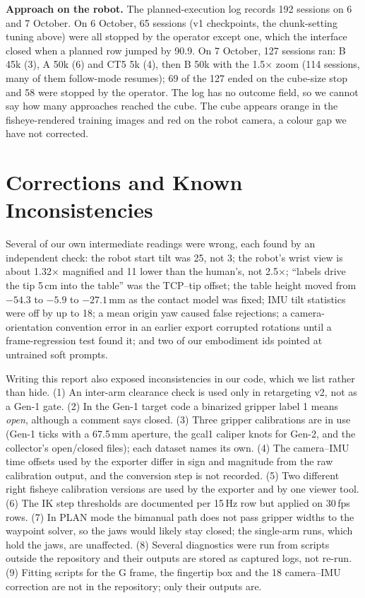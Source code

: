 \documentclass[conference,10pt]{IEEEtran}
\newcommand{\mm}{\,mm\xspace}
\begin{document}
\textbf{Approach on the robot.} The planned-execution log records 192 sessions on 6 and 7 October. On 6 October, 65 sessions (v1
checkpoints, the chunk-setting tuning above) were all stopped by the operator except one, which the interface closed when a planned
row jumped by 90.9\textdegree. On 7 October, 127 sessions ran: B 45k (3), A 50k (6) and CT5 5k (4), then B 50k with the 1.5$\times$
zoom (114 sessions, many of them follow-mode resumes); 69 of the 127 ended on the cube-size stop and 58 were stopped by the operator.
The log has no outcome field, so we cannot say how many approaches reached the cube. The cube appears orange in the
fisheye-rendered training images and red on the robot camera, a colour gap we have not corrected.

\section{Corrections and Known Inconsistencies}\label{sec:corr}
Several of our own intermediate readings were wrong, each found by an independent check: the robot start tilt was 25\textdegree,
not 3\textdegree; the robot's wrist view is about 1.32$\times$ magnified and 11\textdegree{} lower than the human's, not 2.5$\times$;
``labels drive the tip 5\,cm into the table'' was the TCP--tip offset; the table height moved from $-54.3$ to $-5.9$ to $-27.1$\mm as
the contact model was fixed; IMU tilt statistics were off by up to 18\textdegree; a mean origin yaw caused false rejections; a
camera-orientation convention error in an earlier export corrupted rotations until a frame-regression test found it; and two of our
embodiment ids pointed at untrained soft prompts.

Writing this report also exposed inconsistencies in our code, which we list rather than hide. (1) An inter-arm clearance check is
used only in retargeting v2, not as a Gen-1 gate. (2) In the Gen-1 target code a binarized gripper label 1 means \emph{open},
although a comment says closed. (3) Three gripper calibrations are in use (Gen-1 ticks with a 67.5\mm aperture, the gcal1 caliper
knots for Gen-2, and the collector's open/closed files); each dataset names its own. (4) The camera--IMU time offsets used by the
exporter differ in sign and magnitude from the raw calibration output, and the conversion step is not recorded. (5) Two different
right fisheye calibration versions are used by the exporter and by one viewer tool. (6) The IK step thresholds are documented per
15\,Hz row but applied on 30\,fps rows. (7) In PLAN mode the bimanual path does not pass gripper widths to the waypoint solver, so
the jaws would likely stay closed; the single-arm runs, which hold the jaws, are unaffected. (8) Several diagnostics were run from
scripts outside the repository and their outputs are stored as captured logs, not re-run. (9) Fitting scripts for the G frame, the
fingertip box and the 18\textdegree{} camera--IMU correction are not in the repository; only their outputs are.
\end{document}
